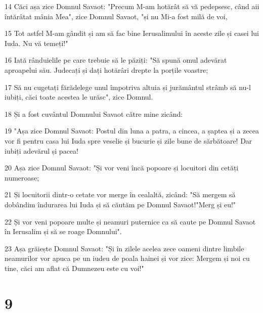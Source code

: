 \par 14 Căci așa zice Domnul Savaot: "Precum M-am hotărât să vă pedepsesc, când aii întărâtat mânia Mea", zice Domnul Savaot, "și nu Mi-a fost milă de voi,
\par 15 Tot astfel M-am gândit și am să fac bine Ierusalimului în aceste zile și casei lui Iuda. Nu vă temeți!"
\par 16 Iată rânduielile pe care trebuie să le păziți: "Să spună omul adevărat aproapelui său. Judecați și dați hotărâri drepte la porțile voastre;
\par 17 Să nu cugetați fărădelege unul împotriva altuia și jurământul strâmb să nu-l iubiți, căci toate acestea le urăsc", zice Domnul.
\par 18 Și a fost cuvântul Domnului Savaot către mine zicând:
\par 19 "Așa zice Domnul Savaot: Postul din luna a patra, a cincea, a șaptea și a zecea vor fi pentru casa lui Iuda spre veselie și bucurie și zile bune de sărbătoare! Dar iubiți adevărul și pacea!
\par 20 Așa zice Domnul Savaot: "Și vor veni încă popoare și locuitori din cetăți numeroase;
\par 21 Și locuitorii dintr-o cetate vor merge în cealaltă, zicând: "Să mergem să dobândim îndurarea lui Iuda și să căutăm pe Domnul Savaot!"Merg și eu!"
\par 22 Și vor veni popoare multe și neamuri puternice ca să caute pe Domnul Savaot în Ierusalim și să se roage Domnului".
\par 23 Așa grăiește Domnul Savaot: "Și în zilele acelea zece oameni dintre limbile neamurilor vor apuca pe un iudeu de poala hainei și vor zice: Mergem și noi cu tine, căci am aflat că Dumnezeu este cu voi!"

\chapter{9}

